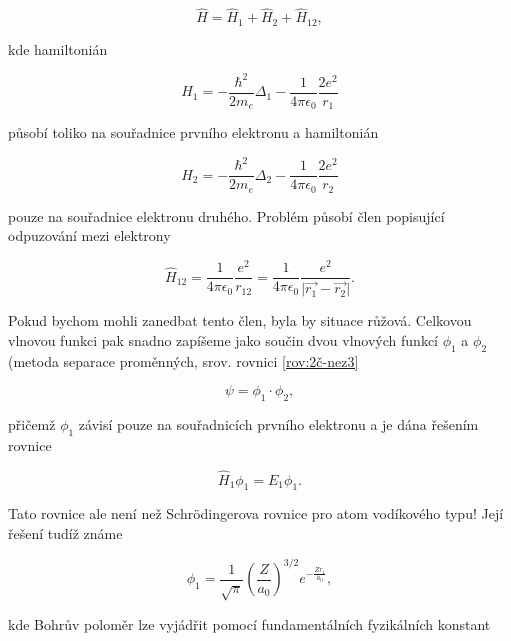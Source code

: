 \begin{equation}
\hat{H} = \hat{H}_1 + \hat{H}_2 + \hat{H}_{12},
\label{rov:VE-2}
\end{equation}

\noindent kde hamiltonián 

\begin{equation}
\hat{H}_1 = - \frac{\hbar^2}{2 m_e} \Delta_1 - \frac{1}{4 \pi \epsilon_0} \frac{2 e^2}{r_1}
\label{rov:VE-3}
\end{equation} 

\noindent působí toliko na souřadnice prvního elektronu a hamiltonián 

\begin{equation}
\hat{H}_2 = - \frac{\hbar^2}{2 m_e} \Delta_2 - \frac{1}{4 \pi \epsilon_0} \frac{2 e^2}{r_2}
\label{rov:VE-4}
\end{equation}

\noindent pouze na souřadnice elektronu druhého. Problém působí člen popisující odpuzování mezi elektrony 

\begin{equation}
\hat{H}_{12} = \frac{1}{4 \pi \epsilon_0} \frac{e^2}{r_{12}} = \frac{1}{4 \pi \epsilon_0} \frac{e^2}{\vert \vec{r_1} - \vec{r_2} \vert}. 
\label{rov:VE-5}
\end{equation}

Pokud bychom mohli zanedbat tento člen, byla by situace růžová. Celkovou vlnovou funkci pak snadno zapíšeme jako součin dvou vlnových funkcí $\phi_1$ a $\phi_2$ (metoda separace proměnných, srov. rovnici \eqref{rov:2č-nez3}

\begin{equation}
\psi = \phi_1 \cdot \phi_2,
\label{rov:VE-6}
\end{equation}

\noindent přičemž $\phi_1$ závisí pouze na souřadnicích prvního elektronu a je dána řešením rovnice

\begin{equation}
\hat{H}_1 \phi_1 = E_1 \phi_1.
\label{rov:VE-7}
\end{equation}

Tato rovnice ale není než  Schr\"odingerova rovnice pro atom vodíkového typu! Její řešení tudíž známe

\begin{equation}
\phi_1 = \frac{1}{\sqrt{\pi}} \left(\frac{Z}{a_0} \right)^{3/2} e^{-\frac{Z r_1}{a_0}},
\label{rov:VE-8}
\end{equation}

\noindent kde Bohrův poloměr lze vyjádřit pomocí fundamentálních fyzikálních konstant

